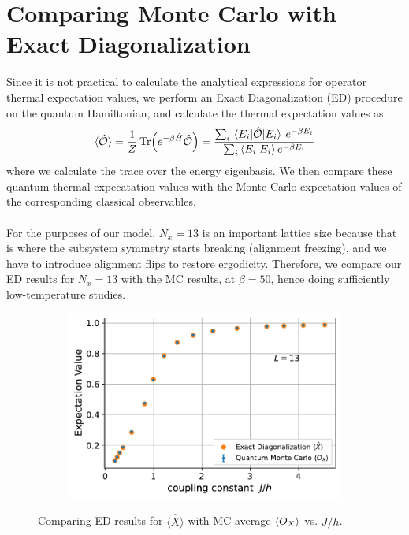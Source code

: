\documentclass[../journal_main.tex]{subfiles}
\begin{document}
\section{Comparing Monte Carlo with Exact Diagonalization}
Since it is not practical to calculate the analytical expressions for operator thermal expectation values, we perform an Exact Diagonalization (ED) procedure on the quantum Hamiltonian, and calculate the thermal expectation values as 
\begin{equation*}
    \langle \hat{\mathcal{O}} \rangle =  \frac{1}{Z} \Tr(e^{-\beta \hat{H}} \hat{\mathcal{O}}) = \frac{\sum_{i} \mel{E_i}{\hat{\mathcal{O}}}{E_i} \: e^{-\beta E_i}}{\sum_i \braket{E_i}{E_i} e^{-\beta E_i}}
\end{equation*}
where we calculate the trace over the energy eigenbasis. We then compare these quantum thermal expecatation values with the Monte Carlo expectation values of the corresponding classical observables.~\\~\\
For the purposes of our model, $N_x = 13$ is an important lattice size because that is where the subsystem symmetry starts breaking (alignment freezing), and we have to introduce alignment flips to restore ergodicity. Therefore, we compare our ED results for $N_x = 13$ with the MC results, at $\beta =50$, hence doing sufficiently low-temperature studies.

\begin{figure}[!htb]
    \centering
    \begin{subfigure}[b]{0.6\textwidth}
        \centering
        \includegraphics[width=\textwidth]{images/13_site/L=13_X.pdf}
    \end{subfigure}
    \caption{Comparing ED results for $\langle \hat{X} \rangle$ with MC average $\expval{O_X}$ vs. $J/h$.}
    \label{expvalX_ED_vs_MC_13}
\end{figure}
\end{document}
